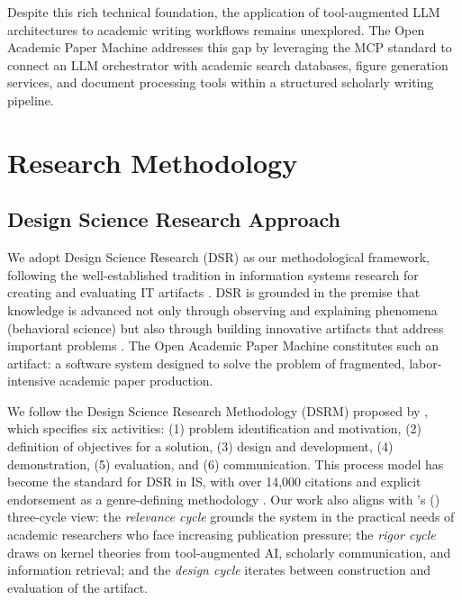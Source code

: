 \documentclass{article}
\begin{document}
Despite this rich technical foundation, the application of tool-augmented LLM architectures to academic writing workflows remains unexplored. The Open Academic Paper Machine addresses this gap by leveraging the MCP standard to connect an LLM orchestrator with academic search databases, figure generation services, and document processing tools within a structured scholarly writing pipeline.


\section{Research Methodology}

\subsection{Design Science Research Approach}

We adopt Design Science Research (DSR) as our methodological framework, following the well-established tradition in information systems research for creating and evaluating IT artifacts \citep{hevner2004design}. DSR is grounded in the premise that knowledge is advanced not only through observing and explaining phenomena (behavioral science) but also through building innovative artifacts that address important problems \citep{hevner2004design}. The Open Academic Paper Machine constitutes such an artifact: a software system designed to solve the problem of fragmented, labor-intensive academic paper production.

We follow the Design Science Research Methodology (DSRM) proposed by \citet{peffers2007dsrm}, which specifies six activities: (1) problem identification and motivation, (2) definition of objectives for a solution, (3) design and development, (4) demonstration, (5) evaluation, and (6) communication. This process model has become the standard for DSR in IS, with over 14,000 citations and explicit endorsement as a genre-defining methodology \citep{peffers2018genres}. Our work also aligns with \citeauthor{hevner2007three_cycle}'s (\citeyear{hevner2007three_cycle}) three-cycle view: the \emph{relevance cycle} grounds the system in the practical needs of academic researchers who face increasing publication pressure; the \emph{rigor cycle} draws on kernel theories from tool-augmented AI, scholarly communication, and information retrieval; and the \emph{design cycle} iterates between construction and evaluation of the artifact.
\end{document}
